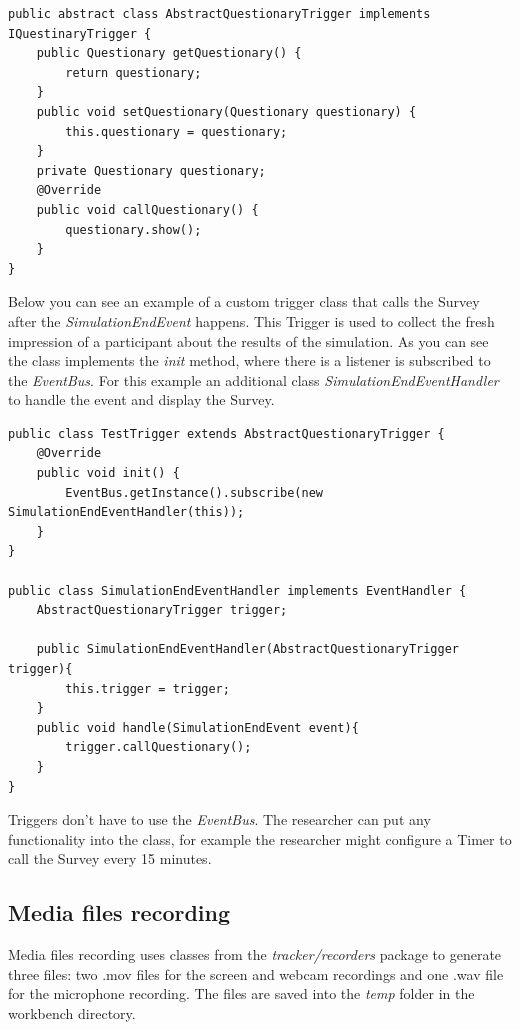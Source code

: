 \lstset{language=Java} 
\begin{lstlisting}
public abstract class AbstractQuestionaryTrigger implements IQuestinaryTrigger {
    public Questionary getQuestionary() {
        return questionary;
    }
    public void setQuestionary(Questionary questionary) {
        this.questionary = questionary;
    }
    private Questionary questionary;
    @Override
    public void callQuestionary() {
        questionary.show();
    }
}
\end{lstlisting}

Below you can see an example of a custom trigger class that calls the Survey after the \textit{SimulationEndEvent} happens. This Trigger is used to collect the fresh impression of a participant about the results of the simulation. As you can see the class implements the \textit{init} method, where there is a listener is subscribed to the \textit{EventBus}. For this example an additional class \textit{SimulationEndEventHandler} to handle the event and display the Survey.\\

\lstset{language=Java} 
\begin{lstlisting}
public class TestTrigger extends AbstractQuestionaryTrigger {
    @Override
    public void init() {
        EventBus.getInstance().subscribe(new SimulationEndEventHandler(this));
    }
}

public class SimulationEndEventHandler implements EventHandler {
    AbstractQuestionaryTrigger trigger;

    public SimulationEndEventHandler(AbstractQuestionaryTrigger trigger){
        this.trigger = trigger;
    }
    public void handle(SimulationEndEvent event){
        trigger.callQuestionary();
    }
}
\end{lstlisting}

Triggers don't have to use the \textit{EventBus}. The researcher can put any functionality into the class, for example the researcher might configure a Timer to call the Survey every 15 minutes. \\


\subsection{Media files recording} \label{subsec:recording}
Media files recording uses classes from the \textit{tracker/recorders} package to generate three files: two .mov files for the screen and webcam recordings and one .wav file for the microphone recording. The files are saved into the \textit{temp} folder in the workbench directory.\\

